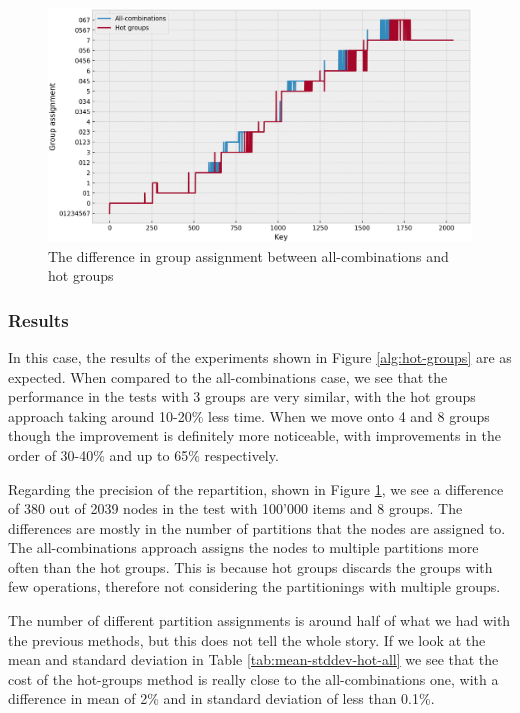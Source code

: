 \begin{figure}[!htb]
  \centering
  \includegraphics[width=\textwidth,height=\textheight,keepaspectratio]{img/partition_difference_hot_all.png}
  \caption{The difference in group assignment between all-combinations and hot groups}
  \label{fig:hot-partitioning}
\end{figure}

\subsubsection{Results}
In this case, the results of the experiments shown in Figure \ref{alg:hot-groups} are as expected. When compared to the all-combinations case, we see that the performance in the tests with 3 groups are very similar, with the hot groups approach taking around 10-20\% less time. When we move onto 4 and 8 groups though the improvement is definitely more noticeable, with improvements in the order of 30-40\% and up to 65\% respectively.

Regarding the precision of the repartition, shown in Figure \ref{fig:hot-partitioning}, we see a difference of 380 out of 2039 nodes in the test with 100'000 items and 8 groups.
The differences are mostly in the number of partitions that the nodes are assigned to. The all-combinations approach assigns the nodes to multiple partitions more often than the hot groups. This is because hot groups discards the groups with few operations, therefore not considering the partitionings with multiple groups.

The number of different partition assignments is around half of what we had with the previous methods, but this does not tell the whole story. If we look at the mean and standard deviation in Table \ref{tab:mean-stddev-hot-all} we see that the cost of the hot-groups method is really close to the all-combinations one, with a difference in mean of 2\% and in standard deviation of less than 0.1\%.

